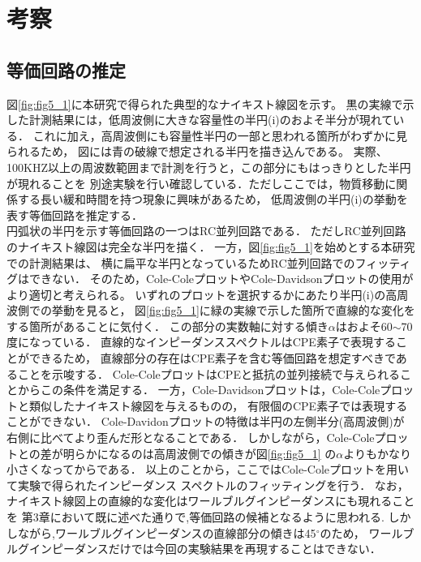 \chapter{考察}
\section{等価回路の推定}
図\ref{fig:fig5_1}に本研究で得られた典型的なナイキスト線図を示す。
黒の実線で示した計測結果には，低周波側に大きな容量性の半円(i)のおよそ半分が現れている．
これに加え，高周波側にも容量性半円の一部と思われる箇所がわずかに見られるため，
図には青の破線で想定される半円を描き込んである。
実際、100KHZ以上の周波数範囲まで計測を行うと，この部分にもはっきりとした半円が現れることを
別途実験を行い確認している．ただしここでは，物質移動に関係する長い緩和時間を持つ現象に興味があるため，
低周波側の半円(i)の挙動を表す等価回路を推定する．\\

円弧状の半円を示す等価回路の一つはRC並列回路である．
ただしRC並列回路のナイキスト線図は完全な半円を描く．
一方，図\ref{fig:fig5_1}を始めとする本研究での計測結果は、
横に扁平な半円となっているためRC並列回路でのフィッティグはできない．
そのため，Cole-ColeプロットやCole-Davidsonプロットの使用がより適切と考えられる。
いずれのプロットを選択するかにあたり半円(i)の高周波側での挙動を見ると，
図\ref{fig:fig5_1}に緑の実線で示した箇所で直線的な変化をする箇所があることに気付く．
この部分の実数軸に対する傾き$\alpha$はおよそ60$\sim$70度になっている．
直線的なインピーダンススペクトルはCPE素子で表現することができるため，
直線部分の存在はCPE素子を含む等価回路を想定すべきであることを示唆する．
Cole-ColeプロットはCPEと抵抗の並列接続で与えられることからこの条件を満足する．
一方，Cole-Davidsonプロットは，Cole-Coleプロットと類似したナイキスト線図を与えるものの，
有限個のCPE素子では表現することができない．
Cole-Davidonプロットの特徴は半円の左側半分(高周波側)が右側に比べてより歪んだ形となることである．
しかしながら，Cole-Coleプロットとの差が明らかになるのは高周波側での傾きが図\ref{fig:fig5_1}
の$\alpha$よりもかなり小さくなってからである．
以上のことから，ここではCole-Coleプロットを用いて実験で得られたインピーダンス
スペクトルのフィッティングを行う．
なお，ナイキスト線図上の直線的な変化はワールブルグインピーダンスにも現れることを
第3章において既に述べた通りで,等価回路の候補となるように思われる.
しかしながら,ワールブルグインピーダンスの直線部分の傾きは45$^\circ$のため，
ワールブルグインピーダンスだけでは今回の実験結果を再現することはできない．

